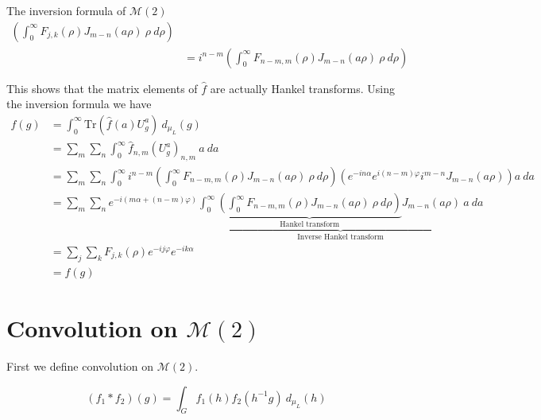 \documentclass{article}
\begin{document}
\begin{Proof}{The inversion formula of $\mathcal{M}(2)$}
\[\begin{split}
                          \left(  \int^{\infty}_{0} F_{j,k}(\rho) J_{m-n}(a\rho)  \ \rho \ d\rho   \right) \\
                          &=
                          i^{n-m}
                          \left(  \int^{\infty}_{0} F_{n-m,m}(\rho) J_{m-n}(a\rho)  \ \rho \ d\rho   \right) \\
                          \\
        \end{split}
    \]%
    This shows that the matrix elements of $\hat{f}$ are actually Hankel transforms.
    Using the inversion formula we have
    \[%
        \begin{split}
            f(g) &= \int^{\infty}_{0} \text{Tr}\left(\hat{f}(a)U^{a}_{g}\right) \ d_{\mu_{L}}(g) \\
                 &=  \sum_{m} \sum_{n} \int^{\infty}_{0} \hat{f}_{n,m} (U^{a}_{g})_{n,m} \ a \ da \\
                 &=  \sum_{m} \sum_{n} \int^{\infty}_{0} 
                          i^{n-m}
                \left( 
                    \int^{\infty}_{0} F_{n-m,m}(\rho) J_{m-n}(a\rho)  \ \rho \ d\rho  
                \right)
                \left(
                    e^{-in\alpha} e^{i(n-m)\varphi}i^{m-n}J_{m-n}(a\rho)   
                \right) a \ da \\
                 &= 
                 \sum_{m} \sum_{n} e^{-i(m\alpha + (n-m)\varphi)}
                 \underbrace{
                 \int^{\infty}_{0} 
                 \underbrace{
                 \left(
                    \int^{\infty}_{0} F_{n-m,m}(\rho) J_{m-n}(a\rho)  \ \rho \ d\rho  
                 \right)}_{\text{Hankel transform}}
                 J_{m-n}(a\rho)  \ a \ da
                 }_{\text{Inverse Hankel transform}}
                 \\
                 &= 
                 \sum_{j} \sum_{k} F_{j,k}(\rho) e^{-ij\varphi} e^{-ik\alpha}
                 \\
                 &= f(g)
        \end{split}
    \]%
\end{Proof}

\section{Convolution on $\mathcal{M}(2)$} 

First we define convolution on $\mathcal{M}(2)$.
\begin{define}
    \[%
        (f_1 * f_2) (g) =  \int_{G} f_1(h) f_2(h^{-1}g)\ d_{\mu_{L}}(h)
    \]%
\end{define}
\end{document}
